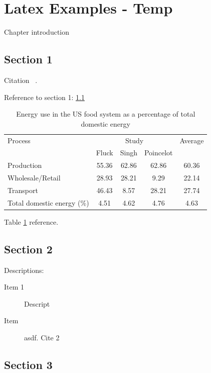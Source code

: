 \section{Latex Examples - Temp} 

Chapter introduction

\subsection{Section 1}
\label{sec:sec-1}

Citation ~\cite{s:source1}.

Reference to section 1: \ref{sec:sec-1}

\begin{table}[h]
\centering
\caption{Energy use in the US food system as a percentage of total domestic energy}
\label{tab_agric_energy}

\vspace{6pt}
\begin{tabular}{lcccc}
\toprule
Process & \multicolumn{3}{c}{Study} & Average \\
\cmidrule(r){2-4}
 & Fluck & Singh & Poincelot & \\
\midrule
Production & 55.36  & 62.86 & 62.86 & 60.36 \\
Wholesale/Retail & 28.93    & 28.21 & 9.29  & 22.14 \\
Transport & 46.43   & 8.57  & 28.21 & 27.74 \\
\midrule
\midrule
Total domestic energy (\%) & 4.51   & 4.62  & 4.76  & 4.63 \\
\bottomrule
\end{tabular}
\end{table}

Table \ref{tab_agric_energy} reference.

\subsection{Section 2}
\label{sec:sec-2}

Descriptions:

\begin{description}

\item[Item 1]
Descript

\item[Item]
asdf. Cite 2 ~\cite{s:source2}

\end{description}

\subsection{Section 3}

